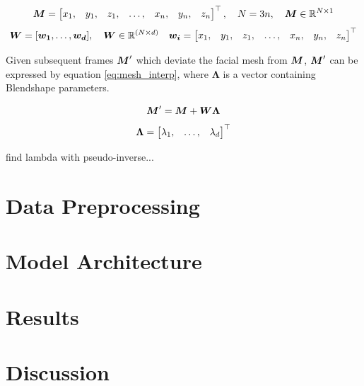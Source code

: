 \begin{equation*}
    {\boldsymbol{{M}}} = \begin{bmatrix} 
                x_{1}, &
                y_{1}, &
                z_{1}, &
                \dots, &
                x_{n}, &
                y_{n}, &
                z_{n}
               \end{bmatrix}^\top,
    \quad
    N = 3n,
    \quad
    {\boldsymbol{{M}}} \in \mathbb{R}^{N\times 1}
\end{equation*}
\begin{equation*}
    {\boldsymbol{{W}}} = [
               {\boldsymbol{{w_1}}}, \dots, {\boldsymbol{{w_d}}}
              ],
    \quad
    {\boldsymbol{{W}}} \in \mathbb{R}^{(N \times d)}
    \quad
    {\boldsymbol{{w_i}}} = \begin{bmatrix} 
                x_{1}, &
                y_{1}, &
                z_{1}, &
                \dots, &
                x_{n}, &
                y_{n}, &
                z_{n}
    \end{bmatrix}^\top
\end{equation*}

Given subsequent frames ${\boldsymbol{{M}}}^{\prime}$ which deviate the facial mesh from ${\boldsymbol{{M}}}$, ${\boldsymbol{{M}}}^{\prime}$ can be expressed by equation \ref{eq:mesh_interp}, where $\bm{\Lambda}$ is a vector containing Blendshape parameters.

\begin{equation}\label{eq:mesh_interp}
    {\boldsymbol{{M}}}^{\prime} = {\boldsymbol{{M}}} + {\boldsymbol{{W}}} {\boldsymbol{{\Lambda}}}
\end{equation}
\quad
\begin{equation*}
    {\boldsymbol{{\Lambda}}} = \begin{bmatrix}
        \lambda_1, &
        \dots, &
        \lambda_d
    \end{bmatrix}^\top
\end{equation*}

find lambda with pseudo-inverse...

\section{Data Preprocessing}

\section{Model Architecture}

\section{Results}

\section{Discussion}

%
%
%